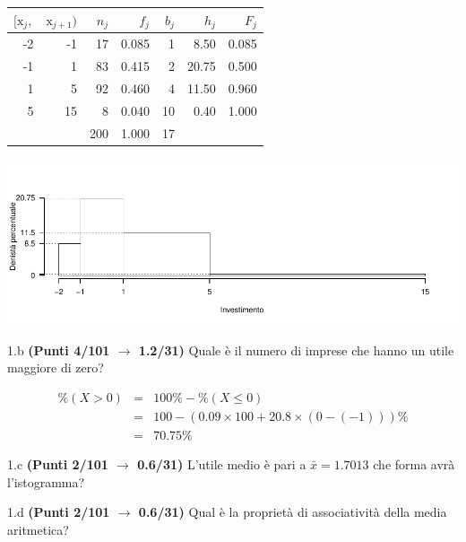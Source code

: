 \documentclass[
  11pt,
]{book}
\theoremstyle{mytheoremstyle}
\theoremstyle{mydefstyle}
\newenvironment{sol}
  {
  \begin{tcolorbox}[enhanced,breakable,arc=0.1mm,boxrule=1pt,colback=white,colframe=iblue,
  title=\bf \fontfamily{lmss}\selectfont \hspace{.5 cm} Soluzione,drop fuzzy shadow]

}{
\end{tcolorbox}
  }
\begin{document}
\begin{sol}

\begin{table}[H]
\centering
\begin{tabular}{rrrrrrr}
\toprule
$[\text{x}_j,$ & $\text{x}_{j+1})$ & $n_j$ & $f_j$ & $b_j$ & $h_j$ & $F_j$\\
\midrule
-2 & -1 & 17 & 0.085 & 1 & 8.50 & 0.085\\
-1 & 1 & 83 & 0.415 & 2 & 20.75 & 0.500\\
1 & 5 & 92 & 0.460 & 4 & 11.50 & 0.960\\
5 & 15 & 8 & 0.040 & 10 & 0.40 & 1.000\\
 &  & 200 & 1.000 & 17 &  & \\
\bottomrule
\end{tabular}
\end{table}

\begin{center}\includegraphics{Esami_passati_con_soluzioni_files/figure-latex/2023-137-1} \end{center}

\end{sol}

1.b \textbf{(Punti 4/101 \(\rightarrow\) 1.2/31)} Quale è il numero di imprese che hanno un utile maggiore di zero?

\begin{sol}
\begin{eqnarray*}
  \%(X>0) &=&  100\%-\%(X\le 0)\\
  &=& 100 - (0.09\times 100 + 20.8\times(0-(-1)))\%\\
  &=& 70.75\%
\end{eqnarray*}

\end{sol}

1.c \textbf{(Punti 2/101 \(\rightarrow\) 0.6/31)} L'utile medio è pari a \(\bar x=1.7013\) che forma avrà l'istogramma?

1.d \textbf{(Punti 2/101 \(\rightarrow\) 0.6/31)} Qual è la proprietà di associatività della media aritmetica?
\end{document}
